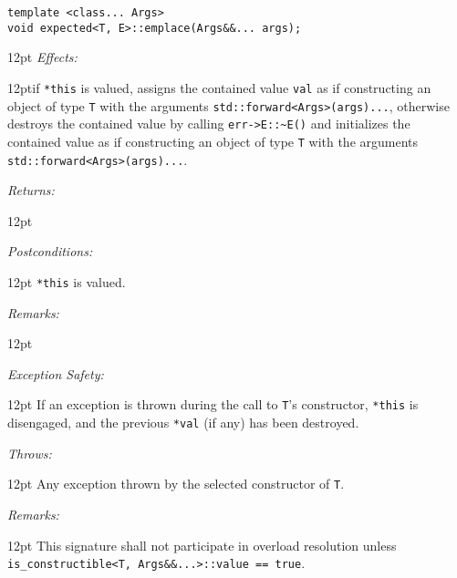 \documentclass[a4paper,10pt]{article}
\newcommand{\cpp}[1]{\lstinline{#1}}
\newcommand{\wordingItem}[1]{\noindent\textit{#1:}}
\newenvironment{wordingTextItem}[1]{\wordingItem{#1}\vspace{7pt}\noindent\begin{adjustwidth}{12pt}{}}{\vspace{7pt}\end{adjustwidth}}
\newenvironment{wordingPara}{\begin{adjustwidth}{12pt}{}}{\end{adjustwidth}}
\begin{document}
\begin{lstlisting}[xleftmargin=0pt]
template <class... Args>
void expected<T, E>::emplace(Args&&... args); 
\end{lstlisting}
\begin{wordingPara}
\begin{wordingTextItem}{Effects}if \cpp{*this} is valued, assigns the contained value \cpp{val} as if constructing an object of type \cpp{T} with the arguments \cpp{std::forward<Args>(args)...}, otherwise \\
destroys the contained value by calling \cpp{err->E::~E()} and  initializes the contained value as if constructing an object of type \cpp{T} with the arguments \cpp{std::forward<Args>(args)...}.
\end{wordingTextItem}
\begin{wordingTextItem}{Returns}
\end{wordingTextItem}
\begin{wordingTextItem}{Postconditions}
\cpp{*this} is valued.
\end{wordingTextItem}
\begin{wordingTextItem}{Remarks}
\end{wordingTextItem}
\begin{wordingTextItem}{Exception Safety}
If an exception is thrown during the call to \cpp{T}'s constructor, \cpp{*this} is disengaged, and the previous \cpp{*val} (if any) has been destroyed.
\end{wordingTextItem}
\begin{wordingTextItem}{Throws}
Any exception thrown by the selected constructor of \cpp{T}.
\end{wordingTextItem}
\begin{wordingTextItem}{Remarks}
This signature shall not participate in overload resolution unless\\
\cpp{is_constructible<T, Args&&...>::value == true}.
\end{wordingTextItem}
\end{wordingPara}
\end{document}
